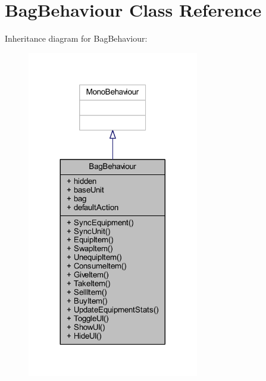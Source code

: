 \hypertarget{class_bag_behaviour}{}\section{Bag\+Behaviour Class Reference}
\label{class_bag_behaviour}


Inheritance diagram for Bag\+Behaviour\+:
\nopagebreak
\begin{figure}[H]
\begin{center}
\leavevmode
\includegraphics[width=212pt]{class_bag_behaviour__inherit__graph}
\end{center}
\end{figure}


